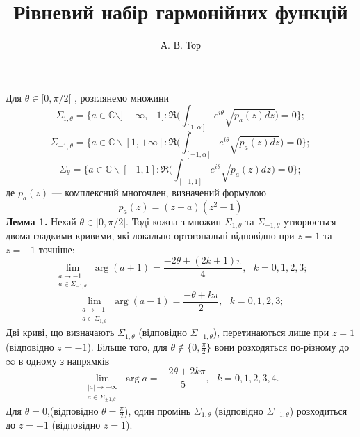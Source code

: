 \documentclass[a4paper]{article}
\title{\bfseries\LARGE Рівневий набір гармонійних функцій}
\author{\large А. В. Тор}
\date{}
\newcommand{\dint}{\displaystyle\int}
\begin{document}
    \maketitle
    Для $\theta \in [0, \pi/2[$ , розглянемо множини
    $$\Sigma_{1,\theta}=\biggl\{a\in\mathbb{C} \backslash]-\infty,-1]:\mathfrak{R} \Biggl(\dint_{[1,\alpha]}e^{i\theta}\sqrt{p_a(z)dz}\Biggr)=0 \biggr\};$$
    $$\Sigma_{-1,\theta}=\biggl\{a\in\mathbb{C} \backslash[1,+\infty]:\mathfrak{R} \Biggl(\dint_{[-1,\alpha]}e^{i\theta}\sqrt{p_a(z)dz}\Biggr)=0 \biggr\};$$
    $$\Sigma_{\theta}=\biggl\{a\in\mathbb{C} \backslash[-1,1]:\mathfrak{R} \Biggl(\dint_{[-1,1]}e^{i\theta}\sqrt{p_a(z)dz}\Biggr)=0 \biggr\};$$
    де $p_a(z)$ — комплексний многочлен, визначений формулою
    $$p_a(z)=(z-a)(z^2-1)$$
    \textbf{Лемма 1.} Нехай $\theta \in [0, \pi/2[$. Тоді кожна з множин $\Sigma_{1,\theta}$ та $\Sigma_{-1,\theta}$ утворюється
    двома гладкими кривими, які локально ортогональні відповідно при $z = 1$ та
    $z = -1$ точніше:
    $$\lim_{\substack{a\to-1 \\ a\in\Sigma_{-1,\theta}}}\arg(a+1)=\dfrac{-2\theta+(2k+1)\pi}{4},\:\:\:k=0,1,2,3;$$
    $$\lim_{\substack{a\to+1 \\ a\in\Sigma_{1,\theta}}}\arg(a-1)=\dfrac{-\theta+k\pi}{2},\:\:\:k=0,1,2,3;$$
    Дві криві, що визначають $\Sigma_{1,\theta}$ (відповідно $\Sigma_{-1,\theta}$), перетинаються лише при
    $z = 1$ (відповідно $z = -1$). Більше того, для $\theta\notin\{0,\frac{\pi}{2}\}$
    вони розходяться по-різному до $\infty$ в одному з напрямків
    $$\lim_{\substack{|a|\to+\infty \\ a\in\Sigma_{\pm 1,\theta}}}\arg a=\dfrac{-2\theta+2k\pi}{5},\:\:\:k=0,1,2,3,4.$$
    Для $\theta=0$,(відповідно $\theta=\frac{\pi}{2}$), один промінь $\Sigma_{1,\theta}$ (відповідно $\Sigma_{-1,\theta}$)
    розходиться до $z = -1$ (відповідно $z = 1$).
\end{document}
